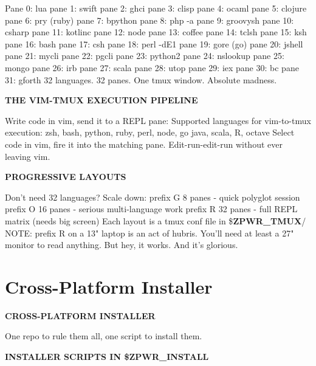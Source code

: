 \documentclass[11pt,a4paper,twoside]{book}
\begin{document}
Pane 0:  lua          pane 1:  swift        pane 2:  ghci pane 3:  clisp        pane 4:  ocaml        pane 5:  clojure pane 6:  pry (ruby)   pane 7:  bpython      pane 8:  php -a pane 9:  groovysh     pane 10: csharp       pane 11: kotlinc pane 12: node         pane 13: coffee       pane 14: tclsh pane 15: ksh          pane 16: bash         pane 17: csh pane 18: perl -dE1    pane 19: gore (go)    pane 20: jshell pane 21: mycli        pane 22: pgcli        pane 23: python2 pane 24: nslookup     pane 25: mongo        pane 26: irb pane 27: scala        pane 28: utop         pane 29: iex pane 30: bc           pane 31: gforth 32 languages. 32 panes. One tmux window. Absolute madness.


\vspace{12pt}
{\bfseries\color{neonyellow} THE VIM-TMUX EXECUTION PIPELINE}\vspace{4pt}

Write code in vim, send it to a REPL pane: Supported languages for vim-to-tmux execution: zsh, bash, python, ruby, perl, node, go java, scala, R, octave Select code in vim, fire it into the matching pane. Edit-run-edit-run without ever leaving vim.


\vspace{12pt}
{\bfseries\color{neonyellow} PROGRESSIVE LAYOUTS}\vspace{4pt}

Don't need 32 languages? Scale down: prefix G  8 panes   - quick polyglot session prefix O  16 panes  - serious multi-language work prefix R  32 panes  - full REPL matrix (needs big screen) Each layout is a tmux conf file in \$\textbf{ZPWR\_TMUX}/ NOTE: prefix R on a 13" laptop is an act of hubris. You'll need at least a 27" monitor to read anything. But hey, it works. And it's glorious.


\vspace{16pt}

\section{Cross-Platform Installer}


\vspace{10pt}
{\large\bfseries\color{neoncyan} CROSS-PLATFORM INSTALLER}\vspace{6pt}

One repo to rule them all, one script to install them.


\vspace{12pt}
{\bfseries\color{neonyellow} INSTALLER SCRIPTS IN \$\textbf{ZPWR\_INSTALL}}\vspace{4pt}
\end{document}

